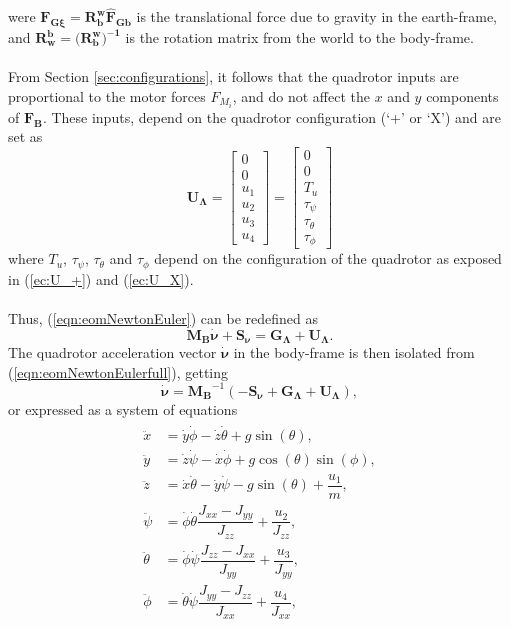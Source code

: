 were $\mathbf{F_{G\xi}}=\mathbf{R_{b}^{w}}\mathbf{\hat{F}_{Gb}}$ is the translational force due to  gravity in the earth-frame, and $\mathbf{R_{w}^{b}} = (\mathbf{R_{b}^{w})^{-1}}$ is the rotation matrix from the world to the body-frame.
\\\\
From Section \ref{sec:configurations}, it follows that the quadrotor inputs are proportional to the motor forces $F_{M_i}$, and do not affect the $x$ and $y$ components of $\mathbf{F_B}$. These inputs, depend on the quadrotor configuration (`+' or `X') and are set as
\begin{equation}
\mathbf{U_{\Lambda}} = \begin{bmatrix}
0 \\[5pt] 0 \\[5pt] u_1 \\[5pt] u_2 \\[5pt] u_3 \\[5pt] u_4
\end{bmatrix} = \begin{bmatrix}
0 \\[5pt] 0 \\[5pt] T_u\\[5pt]
	\tau_{\psi}\\[5pt]
	\tau_{\theta}\\[5pt]
	\tau_{\phi}
\end{bmatrix}
\end{equation}
where $T_u$, $\tau_\psi$, $\tau_\theta$ and $\tau_\phi$ depend on the configuration of the quadrotor as exposed in (\ref{ec:U_+}) and (\ref{ec:U_X}).
\\\\
Thus, (\ref{eqn:eomNewtonEuler}) can be redefined as
\begin{equation}
\label{eqn:eomNewtonEulerfull}
\mathbf{M_{B}}\mathbf{\dot{\nu}} + \mathbf{S_\nu} = \mathbf{G_{\Lambda}} + \mathbf{U_{\Lambda}}.
\end{equation}
The quadrotor acceleration vector $\mathbf{\dot{\nu}}$ in the body-frame is then isolated from (\ref{eqn:eomNewtonEulerfull}), getting
\begin{equation}
\mathbf{\dot{\nu}} = \mathbf{M_{B}}^{-1}(-\mathbf{S_\nu} + \mathbf{G_{\Lambda}} + \mathbf{U_{\Lambda}}),
\end{equation}
or expressed as a system of equations
\begin{align}
\begin{split}
\ddot{x} & = \dot{y} \dot{\phi} - \dot{z} \dot{\theta} + g \sin(\theta), \\[5pt]
\ddot{y} & = \dot{z} \dot{\psi} - \dot{x} \dot{\phi} + g \cos(\theta)\sin(\phi), \\[5pt]
\ddot{z} & = \dot{x} \dot{\theta} - \dot{y} \dot{\psi} - g \sin(\theta) + \dfrac{u_{1}}{m}, \\[5pt]
\ddot{\psi} & = \dot{\phi}\dot{\theta} \dfrac{J_{xx}-J_{yy}}{J_{zz}} + \dfrac{u_{2}}{J_{zz}}, \\[5pt]
\ddot{\theta} & = \dot{\phi} \dot{\psi}\dfrac{J_{zz}-J_{xx}}{J_{yy}} + \dfrac{u_{3}}{J_{yy}}, \\[5pt]
\ddot{\phi} & =  \dot{\theta}\dot{\psi}\dfrac{J_{yy}-J_{zz}}{J_{xx}} + \dfrac{u_{4}}{J_{xx}},
\end{split}
\end{align}
